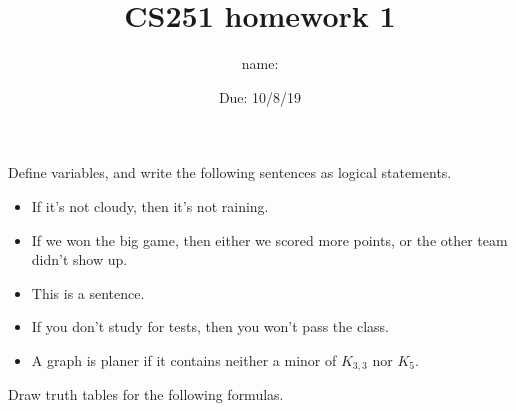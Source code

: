 \documentclass{exam}
\title{CS251 homework 1}
\author{name:\underline{\hspace{2in}}}
\date{Due: 10/8/19}
\def\land{\wedge}           %
\def\T{\top}                %
\def\F{\bot}                %
\begin{document}
\maketitle


\begin{questions}


\question
Define variables, and write the following sentences as logical statements.\\

\begin{itemize}
    \item If it's not cloudy, then it's not raining. \vspace{3cm}
    \item If we won the big game, then either we scored more points, or the other team didn't show up. \vspace{3cm}
    \item This is a sentence. \vspace{3cm}
    \item If you don't study for tests, then you won't pass the class.\vspace{3cm}
    \item A graph is planer if it contains neither a minor of $K_{3,3}$ nor $K_5$.\vspace{3cm}
\end{itemize}


\question

Draw truth tables for the following formulas.\\

%



\end{questions}
\end{document}
